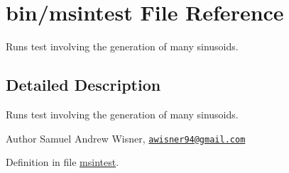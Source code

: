 \hypertarget{msintest}{\section{bin/msintest File Reference}
\label{msintest}
}


Runs test involving the generation of many sinusoids.  




\subsection{Detailed Description}
Runs test involving the generation of many sinusoids. 

\begin{DoxyAuthor}{Author}
Samuel Andrew Wisner, \href{mailto:awisner94@gmail.com}{\tt awisner94@gmail.\+com} 
\end{DoxyAuthor}


Definition in file \hyperlink{msintest_source}{msintest}.

